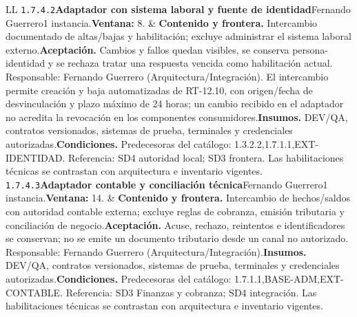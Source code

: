 \begin{longtable}{L{\tabcolsep\relax}L{\tabcolsep\relax}}
\texttt{1.\allowbreak{}7.\allowbreak{}4.\allowbreak{}2}\newline{}\textbf{Adaptador con sistema laboral y fuente de identidad}\newline{}Fernando Guerrero\newline{}1 instancia.\newline{}\textbf{Ventana:} 8. & \textbf{Contenido y frontera.} Intercambio documentado de altas/bajas y habilitación; excluye administrar el sistema laboral externo.\newline{}\textbf{Aceptación.} Cambios y fallos quedan visibles, se conserva persona-identidad y se rechaza tratar una respuesta vencida como habilitación actual. Responsable: Fernando Guerrero (Arquitectura/Integración). El intercambio permite creación y baja automatizadas de RT-12.10, con origen/fecha de desvinculación y plazo máximo de 24 horas; un cambio recibido en el adaptador no acredita la revocación en los componentes consumidores.\newline{}\textbf{Insumos.} DEV/QA, contratos versionados, sistemas de prueba, terminales y credenciales autorizadas.\newline{}\textbf{Condiciones.} Predecesoras del catálogo: 1.3.2.2,1.7.1.1,EXT-IDENTIDAD. Referencia: SD4 autoridad local; SD3 frontera. Las habilitaciones técnicas se contrastan con arquitectura e inventario vigentes.\\\hline
\texttt{1.\allowbreak{}7.\allowbreak{}4.\allowbreak{}3}\newline{}\textbf{Adaptador contable y conciliación técnica}\newline{}Fernando Guerrero\newline{}1 instancia.\newline{}\textbf{Ventana:} 14. & \textbf{Contenido y frontera.} Intercambio de hechos/saldos con autoridad contable externa; excluye reglas de cobranza, emisión tributaria y conciliación de negocio.\newline{}\textbf{Aceptación.} Acuse, rechazo, reintentos e identificadores se conservan; no se emite un documento tributario desde un canal no autorizado. Responsable: Fernando Guerrero (Arquitectura/Integración).\newline{}\textbf{Insumos.} DEV/QA, contratos versionados, sistemas de prueba, terminales y credenciales autorizadas.\newline{}\textbf{Condiciones.} Predecesoras del catálogo: 1.7.1.1,BASE-ADM,EXT-CONTABLE. Referencia: SD3 Finanzas y cobranza; SD4 integración. Las habilitaciones técnicas se contrastan con arquitectura e inventario vigentes.\\\hline

\end{longtable}
